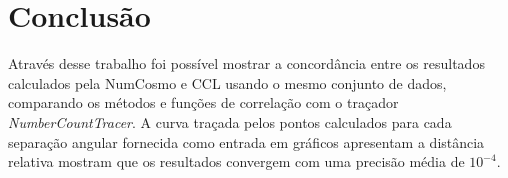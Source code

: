 	\chapter*{Conclusão}

Através desse trabalho foi possível mostrar a concordância entre os resultados calculados pela NumCosmo e CCL usando o mesmo conjunto de dados, comparando os métodos e funções de correlação com o traçador \textit{NumberCountTracer}. A  curva traçada pelos pontos calculados para cada separação angular fornecida como entrada em gráficos apresentam a distância relativa mostram que os resultados convergem com uma precisão média de $ 10^{-4} $.